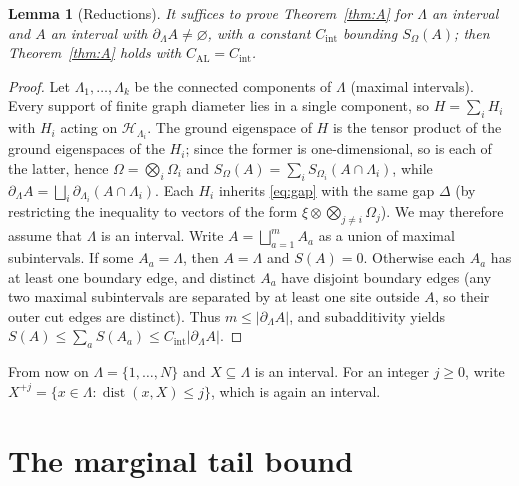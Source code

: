\documentclass[aps,prx,reprint,superscriptaddress,floatfix,nofootinbib,longbibliography,amsmath,amssymb]{revtex4-2}
\newcommand{\dist}{\operatorname{dist}}
\newcommand{\abs}[1]{\lvert #1\rvert}
\newcommand{\cH}{\mathcal H}
\newcommand{\Om}{\Omega}
\newcommand{\Lam}{\Lambda}
\theoremstyle{plain}
\newtheorem{lemma}[theorem]{Lemma}
\theoremstyle{definition}
\begin{document}
\begin{lemma}[Reductions]\label{lem:reductions}
It suffices to prove Theorem~\ref{thm:A} for $\Lam$ an interval and $A$
an interval with $\partial_\Lam A\ne\varnothing$, with a constant
$C_{\mathrm{int}}$ bounding $S_\Om(A)$; then Theorem~\ref{thm:A} holds
with $C_{\mathrm{AL}}=C_{\mathrm{int}}$.
\end{lemma}
\begin{proof}
Let $\Lam_1,\dots,\Lam_k$ be the connected components of $\Lam$ (maximal
intervals). Every support of finite graph diameter lies in a single
component, so $H=\sum_iH_i$ with $H_i$ acting on $\cH_{\Lam_i}$. The
ground eigenspace of $H$ is the tensor product of the ground eigenspaces
of the $H_i$; since the former is one-dimensional, so is each of the
latter, hence $\Om=\bigotimes_i\Om_i$ and
$S_\Om(A)=\sum_iS_{\Om_i}(A\cap\Lam_i)$, while
$\partial_\Lam A=\bigsqcup_i\partial_{\Lam_i}(A\cap\Lam_i)$. Each $H_i$
inherits \eqref{eq:gap} with the same gap $\Delta$ (by restricting the
inequality to vectors of the form $\xi\otimes\bigotimes_{j\ne i}\Om_j$).
We may therefore assume that $\Lam$ is an interval. Write
$A=\bigsqcup_{a=1}^mA_a$ as a union of maximal subintervals. If some
$A_a=\Lam$, then $A=\Lam$ and $S(A)=0$. Otherwise each $A_a$ has at least
one boundary edge, and distinct $A_a$ have disjoint boundary edges (any
two maximal subintervals are separated by at least one site outside $A$,
so their outer cut edges are distinct). Thus $m\le\abs{\partial_\Lam A}$,
and subadditivity yields
$S(A)\le\sum_aS(A_a)\le C_{\mathrm{int}}\abs{\partial_\Lam A}$.
\end{proof}

From now on $\Lam=\{1,\dots,N\}$ and $X\subseteq\Lam$ is an interval. For
an integer $j\ge0$, write $X^{+j}=\{x\in\Lam:\dist(x,X)\le j\}$, which is
again an interval.

\section{The marginal tail bound}\label{sec:tail}
\end{document}
